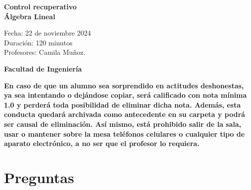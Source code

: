 \documentclass[a4paper]{article}
\theoremstyle{exampstyle}
\theoremstyle{definition}
\begin{document}
\thispagestyle{fancy}
\vspace*{1cm}

\begin{minipage}[r]{12cm}
    \begin{flushright}
    \end{flushright}
\end{minipage}

\begin{center}
\Large{\textbf{Control recuperativo\\ Álgebra Lineal\\ }}
\end{center}
\vspace{1cm}
\begin{minipage}[r]{15cm}
\begin{flushleft}

Fecha: 22 de noviembre 2024 \\%
Duración: 120 minutos  \\
Profesores: Camila Muñoz.\\
\end{flushleft}
\end{minipage}
\vspace{2cm}
\begin{center}
\Large{\textbf{Facultad de Ingeniería}}
\end{center}
\vspace{1cm}
\textbf{En caso de que un alumno sea sorprendido en actitudes deshonestas, ya sea intentando o
dejándose copiar, será calificado con nota mínima 1.0 y perderá toda posibilidad de eliminar
dicha nota. Además, esta conducta quedará archivada como antecedente en su carpeta y
podrá ser causal de eliminación.
Así mismo, está prohibido salir de la sala, usar o mantener sobre la mesa teléfonos celulares
o cualquier tipo de aparato electrónico, a no ser que el profesor lo requiera.}\\



\vspace{5cm}
\newpage
\thispagestyle{empty}
\section*{Preguntas}
\end{document}

